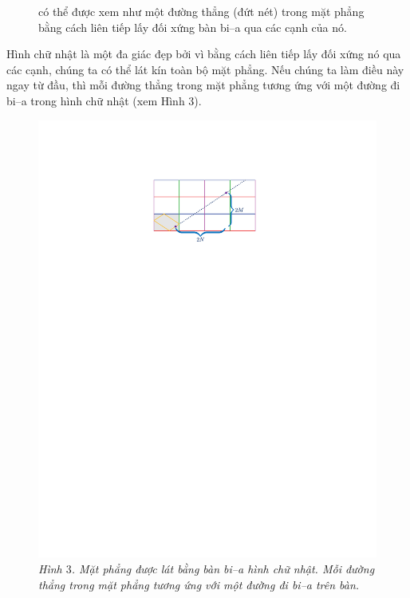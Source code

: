 \begin{multicols}{2}
\begin{figure}[H]
{{		có thể được xem như một đường thẳng (đứt nét) trong mặt phẳng bằng cách liên tiếp lấy đối xứng bàn bi--a qua các cạnh của nó.}}
		\vspace*{-10pt}
	\end{figure}
	Hình chữ nhật là một đa giác đẹp bởi vì  bằng cách liên tiếp lấy đối xứng nó qua các cạnh, chúng ta có thể lát kín toàn bộ mặt phẳng. Nếu chúng ta làm điều này ngay từ đầu,
	thì mỗi đường thẳng trong mặt phẳng tương ứng với một đường đi bi--a trong hình chữ nhật (xem Hình $3$).
	\begin{figure}[H]
		\vspace*{-5pt}
		\centering
		\captionsetup{labelformat= empty, justification=centering}
		\includegraphics[width= 1\linewidth]{3}
		\caption{\small\textit{\color{duongvaotoanhoc}Hình $3$. Mặt phẳng được lát bằng bàn bi--a hình chữ nhật. Mỗi đường thẳng
		trong mặt phẳng tương ứng với một đường đi bi--a trên bàn.}}
		\vspace*{-10pt}
	\end{figure}

\end{multicols}

